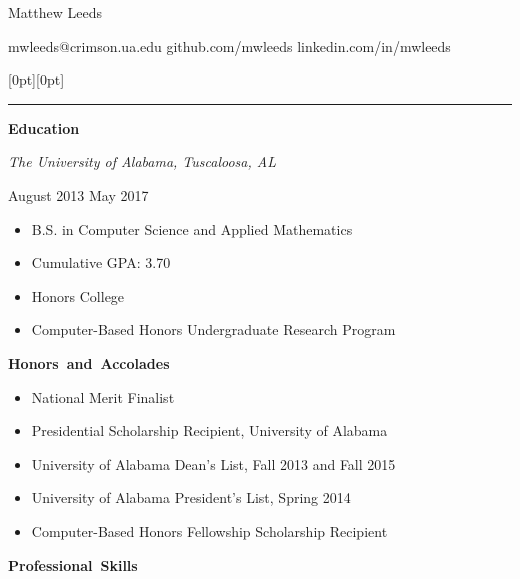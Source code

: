 \documentclass[11pt]{article}
\begin{document}
\centerline{\huge Matthew Leeds}
\vspace{0.4em}
\centerline{\normalsize mwleeds@crimson.ua.edu \space \textbar \space github.com/mwleeds \space \textbar \space linkedin.com/in/mwleeds}

\noindent \begin{minipage}[t]{1.04\textwidth}
\raisebox{9pt}[0pt][0pt]{\rule{\textwidth}{0.2mm}\hspace{-\textwidth}}
\end{minipage}

\vspace{1em}
\hbox{\large \textbf{Education}}

\begin{minipage}[t]{0.7\textwidth}
\flushleft
\textit{The University of Alabama, Tuscaloosa, AL}\\
\end{minipage}
\begin{minipage}[t]{0.3\textwidth}
\flushright
August 2013 \space \textemdash \space May 2017\\
\end{minipage}

\begin{itemize}
  \item B.S. in Computer Science and Applied Mathematics
  \item Cumulative GPA: 3.70
  \item Honors College
  \item Computer-Based Honors Undergraduate Research Program
\end{itemize}

\vspace{1em}
\hbox{\large \textbf{Honors and Accolades}}

\begin{itemize}
  \item National Merit Finalist
  \item Presidential Scholarship Recipient, University of Alabama
  \item University of Alabama Dean's List, Fall 2013 and Fall 2015
  \item University of Alabama President's List, Spring 2014
  \item Computer-Based Honors Fellowship Scholarship Recipient
\end{itemize}

\vspace{1em}
\hbox{\large \textbf{Professional Skills}}
\end{document}
